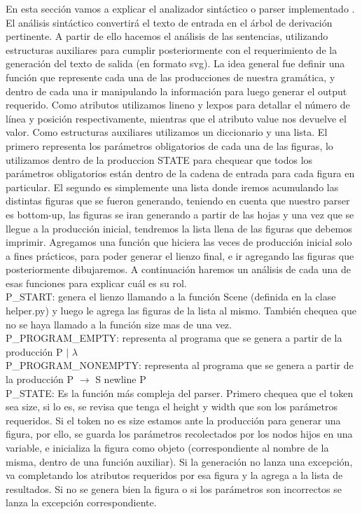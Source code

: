 En esta sección vamos a explicar el analizador sintáctico o parser implementado . El análisis sintáctico convertirá el texto de entrada
en el árbol de derivación pertinente. A partir de ello hacemos el análisis de las sentencias, utilizando estructuras auxiliares para
cumplir posteriormente con el requerimiento de la generación del texto de salida (en formato svg).
La idea general fue definir una función que represente cada una de las producciones de nuestra gramática, y dentro de cada una ir manipulando la
información para luego generar el output requerido.
Como atributos utilizamos lineno y lexpos para detallar el número de línea y posición respectivamente, mientras que el atributo value nos devuelve el valor.
Como estructuras auxiliares utilizamos un diccionario y una lista. El primero representa los parámetros obligatorios de cada una de las
figuras, lo utilizamos dentro de la produccion STATE para chequear que todos los parámetros obligatorios están dentro de la cadena de entrada
para cada figura en particular. El segundo es simplemente una lista donde iremos acumulando las distintas figuras que se fueron generando, teniendo
en cuenta que nuestro parser es bottom-up, las figuras se iran generando a partir de las hojas y una vez que se llegue a la producción inicial, tendremos
la lista llena de las figuras que debemos imprimir.
Agregamos una función que hiciera las veces de producción inicial solo a fines prácticos, para poder generar el lienzo final, e ir
agregando las figuras que posteriormente dibujaremos.
A continuación haremos un análisis de cada una de esas funciones para explicar cuál es su rol.\\

P_START: genera el lienzo llamando a la función Scene (definida en la clase helper.py) y luego le agrega las figuras de la lista al mismo.
También chequea que no se haya llamado a la función size mas de una vez.\\

P_PROGRAM_EMPTY: representa al programa que se genera a partir de la producción P $\mid$ $\lambda$\\

P_PROGRAM_NONEMPTY: representa al programa que se genera a partir de la producción P $\rightarrow$ S newline P\\

P_STATE: Es la función más compleja del parser. Primero chequea que el token sea size, si lo es, se revisa que tenga el height y width que son los parámetros requeridos.
Si el token no es size estamos ante la producción para generar una figura, por ello, se guarda los parámetros recolectados por los nodos hijos en una variable,
 e inicializa la figura como objeto (correspondiente al nombre de la misma, dentro de una función auxiliar).
Si la generación no lanza una excepción, va completando los atributos requeridos por esa figura y la agrega a la lista de resultados. Si no se genera bien la figura o si
los parámetros son incorrectos se lanza la excepción correspondiente.\\

